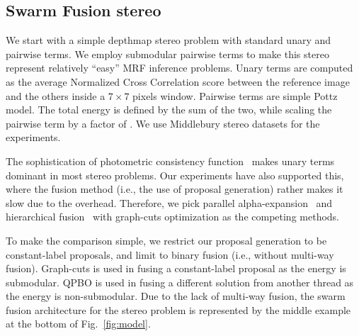 \subsection{Swarm Fusion stereo}
We start with a simple depthmap stereo problem with standard unary and
pairwise terms. We employ submodular pairwise terms to make this stereo
represent relatively ``easy'' MRF inference problems.
%
Unary terms are computed as the average Normalized Cross Correlation
score between the reference image and the others inside a $7\times 7$
pixels window. Pairwise terms are simple Pottz model. The total energy
is defined by the sum of the two, while scaling the pairwise term by a
factor of .
%
We use Middlebury stereo datasets for the experiments.


\noindent The sophistication of photometric consistency
function~\cite{mvs_furukawa_survey} makes unary terms dominant in most
stereo problems.  Our experiments have also supported this, where the
fusion method (i.e., the use of proposal generation) rather makes it slow
due to the overhead.  Therefore, we pick parallel
alpha-expansion~\cite{delong} and hierarchical fusion~\cite{delong,olga}
with graph-cuts optimization as the competing methods.


\noindent To make the comparison simple, we restrict our proposal
generation to be constant-label proposals, and limit to binary fusion
(i.e., without multi-way fusion). Graph-cuts is used in fusing a
constant-label proposal as the energy is submodular. QPBO is used in
fusing a different solution from another thread as the energy is
non-submodular.  Due to the lack of multi-way fusion, the swarm fusion
architecture for the stereo problem is represented by the middle
example at the bottom of Fig.~\ref{fig:model}.
